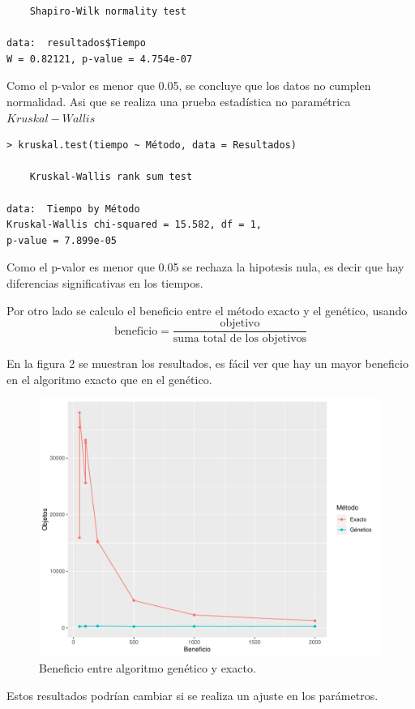 \documentclass[12pt,letterpaper]{article}
\begin{document}
\begin{itemize}
\begin{lstlisting}
    Shapiro-Wilk normality test

data:  resultados$Tiempo
W = 0.82121, p-value = 4.754e-07
\end{lstlisting}
Como el p-valor es menor que 0.05, se concluye que los datos no cumplen normalidad. Asi que se realiza una prueba estadística no paramétrica $Kruskal-Wallis$

\begin{lstlisting}
> kruskal.test(tiempo ~ Método, data = Resultados)

    Kruskal-Wallis rank sum test

data:  Tiempo by Método
Kruskal-Wallis chi-squared = 15.582, df = 1,
p-value = 7.899e-05
\end{lstlisting}
Como el p-valor es menor que 0.05 se rechaza la hipotesis nula, es decir que hay diferencias significativas en los tiempos. 

Por otro lado se calculo el beneficio entre el método exacto y el genético, usando 
\begin{equation}
\text{beneficio}= \frac{\text{objetivo}}{\text{suma total de los objetivos}}
\end{equation}

En la figura 2 se muestran los resultados, es fácil ver que hay un mayor beneficio en el algoritmo exacto que en el genético. 
\begin{figure}[H]
  \centering
  \includegraphics[scale=0.8]{tarea}
  \caption{Beneficio entre algoritmo genético y exacto.}
\end{figure}
Estos resultados podrían cambiar si se realiza un ajuste en los parámetros. 
\newpage

\end{itemize}
\end{document}
